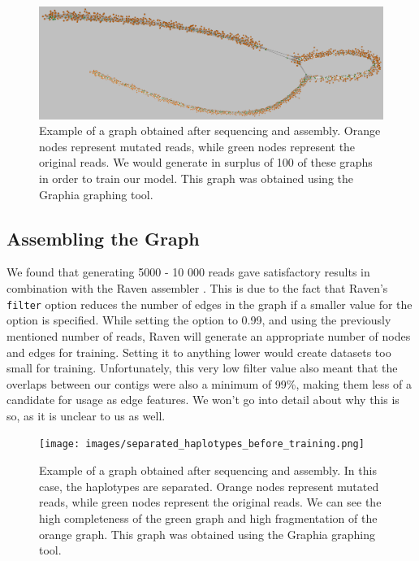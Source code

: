 \documentclass[times, utf8, diplomski, english]{fer_eng}
\begin{document}
\begin{figure}[h]
	\centering
	\includegraphics[width=\textwidth]{images/graph_example.png}
	\caption[Graph]{Example of a graph obtained after sequencing and assembly. Orange nodes represent mutated reads, while green nodes represent the original reads. We would generate in surplus of 100 of these graphs in order to train our model. This graph was obtained using the Graphia\footnotemark{} graphing tool.}
	\label{fig:graph}
\end{figure}

\subsection{Assembling the Graph}
\label{subsec:assembling the graph}

We found that generating 5000 - 10 000 reads gave satisfactory results in combination with the Raven assembler \cite{Vaser}. This is due to the fact that Raven's \texttt{filter} option reduces the number of edges in the graph if a smaller value for the option is specified. While setting the option to 0.99, and using the previously mentioned number of reads, Raven will generate an appropriate number of nodes and edges for training. Setting it to anything lower would create datasets too small for training. Unfortunately, this very low filter value also meant that the overlaps between our contigs were also a minimum of 99\%, making them less of a candidate for usage as edge features. We won't go into detail about why this is so, as it is unclear to us as well.

\begin{figure}[h]
	\centering
	\texttt{[image: images/separated\_haplotypes\_before\_training.png]}
	\caption[Separated graph]{Example of a graph obtained after sequencing and assembly. In this case, the haplotypes are separated. Orange nodes represent mutated reads, while green nodes represent the original reads. We can see the high completeness of the green graph and high fragmentation of the orange graph. This graph was obtained using the Graphia\footnotemark{} graphing tool.}
	\label{fig:separated graph}
\end{figure}
\end{document}
